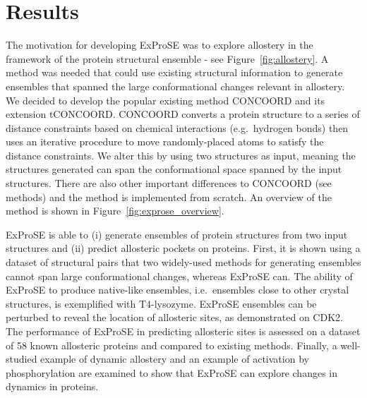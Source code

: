 \section{Results}
\label{sec:exprose_results}

The motivation for developing ExProSE was to explore allostery in the framework of the protein structural ensemble - see Figure~\ref{fig:allostery}.
A method was needed that could use existing structural information to generate ensembles that spanned the large conformational changes relevant in allostery.
We decided to develop the popular existing method CONCOORD and its extension tCONCOORD.
CONCOORD converts a protein structure to a series of distance constraints based on chemical interactions (e.g.\ hydrogen bonds) then uses an iterative procedure to move randomly-placed atoms to satisfy the distance constraints.
We alter this by using two structures as input, meaning the structures generated can span the conformational space spanned by the input structures.
There are also other important differences to CONCOORD (see methods) and the method is implemented from scratch.
An overview of the method is shown in Figure~\ref{fig:exprose_overview}.

ExProSE is able to (i) generate ensembles of protein structures from two input structures and (ii) predict allosteric pockets on proteins.
First, it is shown using a dataset of structural pairs that two widely-used methods for generating ensembles cannot span large conformational changes, whereas ExProSE can.
The ability of ExProSE to produce native-like ensembles, i.e.\ ensembles close to other crystal structures, is exemplified with T4-lysozyme.
ExProSE ensembles can be perturbed to reveal the location of allosteric sites, as demonstrated on CDK2.
The performance of ExProSE in predicting allosteric sites is assessed on a dataset of 58 known allosteric proteins and compared to existing methods.
Finally, a well-studied example of dynamic allostery and an example of activation by phosphorylation are examined to show that ExProSE can explore changes in dynamics in proteins.


